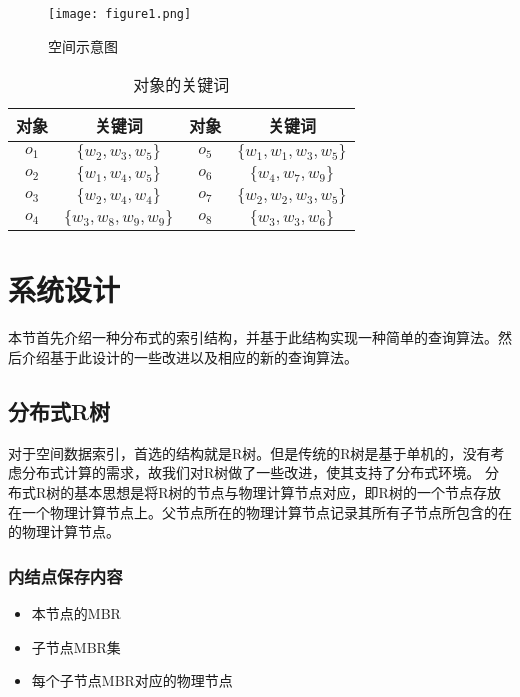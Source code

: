 \documentclass{elegantpaper}
\begin{document}
\begin{figure}[!ht]
	\centering
	\texttt{[image: figure1.png]}
	\caption{空间示意图\label{fig:figure1}}
\end{figure}

\begin{table}[!htbp]
    \small
    \centering
    \caption{对象的关键词}
      \begin{tabular}{cccc}
      对象&关键词&对象&关键词\\
      \hline
      $o_1$   & $\{w_2,w_3,w_5\}$ & $o_5$&$\{w_1,w_1,w_3,w_5\}$\\
      $o_2$   & $\{w_1,w_4,w_5\}$ & $o_6$&$\{w_4,w_7,w_9\}$\\
      $o_3$   & $\{w_2,w_4,w_4\}$ & $o_7$&$\{w_2,w_2,w_3,w_5\}$\\
      $o_4$   & $\{w_3,w_8,w_9,w_9\}$ & $o_8$&$\{w_3,w_3,w_6\}$\\
      \end{tabular}
\end{table}
  







\section{系统设计}

本节首先介绍一种分布式的索引结构，并基于此结构实现一种简单的查询算法。然后介绍基于此设计的一些改进以及相应的新的查询算法。

\subsection{分布式R树}

对于空间数据索引，首选的结构就是R树。但是传统的R树是基于单机的，没有考虑分布式计算的需求，故我们对R树做了一些改进，使其支持了分布式环境。
分布式R树的基本思想是将R树的节点与物理计算节点对应，即R树的一个节点存放在一个物理计算节点上。父节点所在的物理计算节点记录其所有子节点所包含的在的物理计算节点。

\subsubsection{内结点保存内容}

\begin{itemize}

    \item 本节点的MBR

    \item 子节点MBR集

    \item 每个子节点MBR对应的物理节点
    
\end{itemize}
\end{document}
